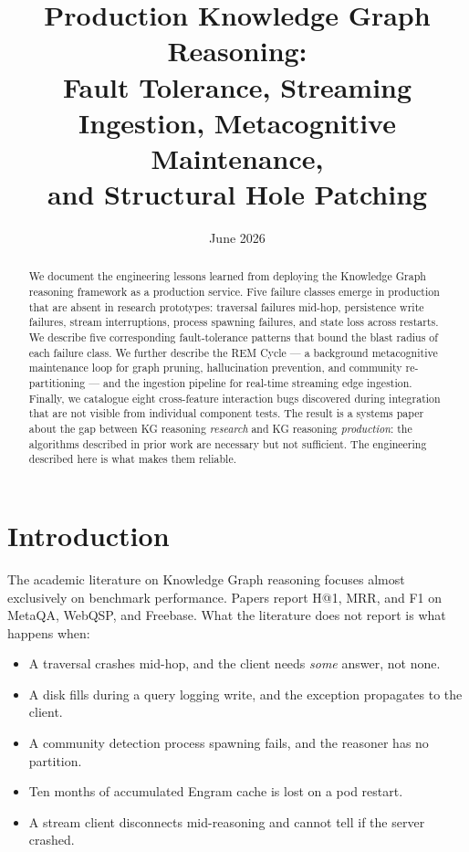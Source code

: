 \documentclass[10pt,twocolumn]{article}
\title{\textbf{Production Knowledge Graph Reasoning:\\
Fault Tolerance, Streaming Ingestion, Metacognitive Maintenance,\\
and Structural Hole Patching}}
\date{June 2026}
\begin{document}
\maketitle

\begin{abstract}
We document the engineering lessons learned from deploying the \CEREBRUM{} Knowledge
Graph reasoning framework as a production service. Five failure classes emerge in
production that are absent in research prototypes: traversal failures mid-hop, persistence
write failures, stream interruptions, process spawning failures, and state loss across
restarts. We describe five corresponding fault-tolerance patterns that bound the blast
radius of each failure class. We further describe the REM Cycle — a background
metacognitive maintenance loop for graph pruning, hallucination prevention, and
community re-partitioning — and the \THALAMUS{} ingestion pipeline for real-time
streaming edge ingestion. Finally, we catalogue eight cross-feature interaction bugs
discovered during integration that are not visible from individual component tests.
The result is a systems paper about the gap between KG reasoning \emph{research} and
KG reasoning \emph{production}: the algorithms described in prior work are necessary
but not sufficient. The engineering described here is what makes them reliable.
\end{abstract}

\section{Introduction}
\label{sec:intro}

The academic literature on Knowledge Graph reasoning focuses almost exclusively on
benchmark performance. Papers report H@1, MRR, and F1 on MetaQA, WebQSP, and Freebase.
What the literature does not report is what happens when:
\begin{itemize}
  \item A traversal crashes mid-hop, and the client needs \emph{some} answer, not none.
  \item A disk fills during a query logging write, and the exception propagates to the client.
  \item A community detection process spawning fails, and the reasoner has no partition.
  \item Ten months of accumulated Engram cache is lost on a pod restart.
  \item A stream client disconnects mid-reasoning and cannot tell if the server crashed.
\end{itemize}
\end{document}
